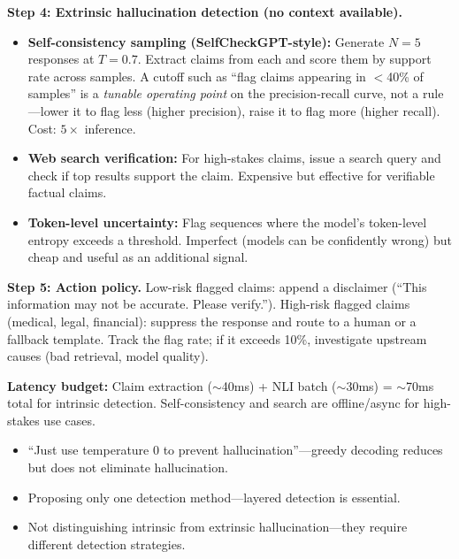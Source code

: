 \begin{interviewq}
\textbf{Step 4: Extrinsic hallucination detection (no context available).}
\begin{itemize}
    \item \textbf{Self-consistency sampling (SelfCheckGPT-style):} Generate $N = 5$ responses at $T = 0.7$. Extract claims from each and score them by support rate across samples. A cutoff such as ``flag claims appearing in $<$40\% of samples'' is a \textit{tunable operating point} on the precision-recall curve, not a rule---lower it to flag less (higher precision), raise it to flag more (higher recall). Cost: $5\times$ inference.
    \item \textbf{Web search verification:} For high-stakes claims, issue a search query and check if top results support the claim. Expensive but effective for verifiable factual claims.
    \item \textbf{Token-level uncertainty:} Flag sequences where the model's token-level entropy exceeds a threshold. Imperfect (models can be confidently wrong) but cheap and useful as an additional signal.
\end{itemize}

\textbf{Step 5: Action policy.} Low-risk flagged claims: append a disclaimer (``This information may not be accurate. Please verify.''). High-risk flagged claims (medical, legal, financial): suppress the response and route to a human or a fallback template. Track the flag rate; if it exceeds 10\%, investigate upstream causes (bad retrieval, model quality).

\textbf{Latency budget:} Claim extraction ($\sim$40ms) + NLI batch ($\sim$30ms) = $\sim$70ms total for intrinsic detection. Self-consistency and search are offline/async for high-stakes use cases.

\redflags
\begin{itemize}
    \item ``Just use temperature 0 to prevent hallucination''---greedy decoding reduces but does not eliminate hallucination.
    \item Proposing only one detection method---layered detection is essential.
    \item Not distinguishing intrinsic from extrinsic hallucination---they require different detection strategies.
\end{itemize}



\end{interviewq}
